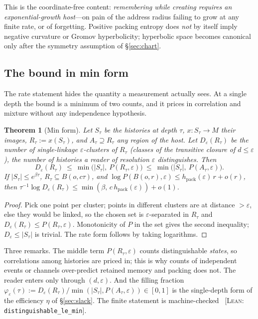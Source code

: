 \documentclass[11pt,reqno]{amsart}
\theoremstyle{plain}
\newtheorem{theorem}{Theorem}[section]
\theoremstyle{definition}
\newcommand{\hpack}{h_{\mathrm{pack}}}
\newcommand{\eps}{\varepsilon}
\newcommand{\cert}[1]{{\footnotesize\ [\textsc{Lean}: \texttt{#1}]}}
\begin{document}
This is the coordinate-free content: \emph{remembering while creating requires an exponential-growth host}---on pain of the address radius failing to grow at any finite rate, or of forgetting. Positive packing entropy does \emph{not} by itself imply negative curvature or Gromov hyperbolicity; hyperbolic space becomes canonical only after the symmetry assumption of \S\ref{sec:chart}.

\subsection{The bound in min form}\label{sec:minform}

The rate statement hides the quantity a measurement actually sees. At a single depth the bound is a minimum of two counts, and it prices in correlation and mixture without any independence hypothesis.

\begin{theorem}[Min form]\label{thm:minform}
Let $S_\tau$ be the histories at depth $\tau$, $x:S_\tau\to M$ their images, $R_\tau:=x(S_\tau)$, and $A_\tau\supseteq R_\tau$ any region of the host. Let $D_\eps(R_\tau)$ be the number of single-linkage $\eps$-clusters of $R_\tau$ (classes of the transitive closure of $d\le\eps$), the number of histories a reader of resolution $\eps$ distinguishes. Then
\[
D_\eps(R_\tau)\ \le\ \min\big(|S_\tau|,\ P(R_\tau,\eps)\big)\ \le\ \min\big(|S_\tau|,\ P(A_\tau,\eps)\big).
\]
If $|S_\tau|\le e^{\beta\tau}$, $R_\tau\subseteq B(o,c\tau)$, and $\log P(B(o,r),\eps)\le\hpack(\eps)\,r+o(r)$, then $\tau^{-1}\log D_\eps(R_\tau)\le\min(\beta,\,c\,\hpack(\eps))+o(1)$.
\end{theorem}

\begin{proof}
Pick one point per cluster; points in different clusters are at distance $>\eps$, else they would be linked, so the chosen set is $\eps$-separated in $R_\tau$ and $D_\eps(R_\tau)\le P(R_\tau,\eps)$. Monotonicity of $P$ in the set gives the second inequality; $D_\eps\le|S_\tau|$ is trivial. The rate form follows by taking logarithms.
\end{proof}

Three remarks. The middle term $P(R_\tau,\eps)$ counts distinguishable \emph{states}, so correlations among histories are priced in; this is why counts of independent events or channels over-predict retained memory and packing does not. The reader enters only through $(d,\eps)$. And the filling fraction $\varphi_\eps(\tau):=D_\eps(R_\tau)/\min(|S_\tau|,P(A_\tau,\eps))\in[0,1]$ is the single-depth form of the efficiency $\eta$ of \S\ref{sec:slack}. The finite statement is machine-checked \cert{distinguishable\_le\_min}.
\end{document}
